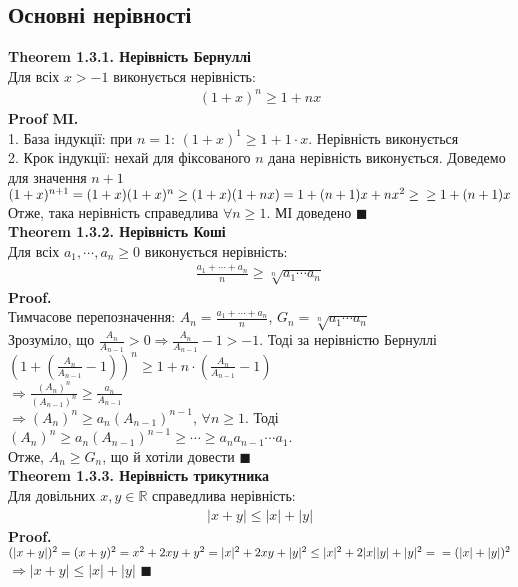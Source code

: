 \documentclass[a4paper, 14pt]{extarticle}
\def\huge{\displaystyle}
\def\bigline{\vspace{5mm}\\}
\def\bigline{\vspace{5mm}\\}
\def\qed{$\blacksquare$}
\begin{document}
\subsection{Основні нерівності}
	\textbf{Theorem 1.3.1. Нерівність Бернуллі}\\ Для всіх $x>-1$ виконується нерівність:
	\begin{align*}
	(1+x)^n \geq 1+nx
	\end{align*}
	\textbf{Proof MI.}\\
	1. База індукції: при $n=1$: $(1+x)^1 \geq 1+1\cdot x$. Нерівність виконується\\
	2. Крок індукції: нехай для фіксованого $n$ дана нерівність виконується. Доведемо для значення $n+1$\\
	$(1+x)^{n+1}=(1+x)(1+x)^n \geq (1+x)(1+nx)=1+(n+1)x+nx^2 \geq \\ \geq 1+(n+1)x$\\
	Отже, така нерівність справедлива $\forall n \geq 1$. МІ доведено \qed
	\bigline
	\textbf{Theorem 1.3.2. Нерівність Коші}\\
	Для всіх $a_1, \cdots, a_n \geq 0$ виконується нерівність:
	\begin{align*}
	\frac{a_1+\cdots+a_n}{n} \geq \sqrt[n]{a_1 \cdots a_n}
	\end{align*}
	\textbf{Proof.}\\
	Тимчасове перепозначення: $\huge A_n = \frac{a_1+\cdots+a_n}{n}$, $\huge G_n = \sqrt[n]{a_1 \cdots a_n}$\\
	Зрозуміло, що $\huge \frac{A_n}{A_{n-1}} > 0 \Rightarrow \frac{A_n}{A_{n-1}}-1>-1$. Тоді за нерівністю Бернуллі\\
	$\huge \left(1+ \left(\frac{A_n}{A_{n-1}} -1 \right) \right)^n \geq 1 + n \cdot \left(\frac{A_n}{A_{n-1}} -1 \right)$\\
	$\Rightarrow \huge \frac{(A_n)^n}{(A_{n-1})^n} \geq \frac{a_n}{A_{n-1}}$\\
	$\Rightarrow \huge (A_n)^n \geq a_n (A_{n-1})^{n-1}$, $\forall n \geq 1$. Тоді\\
	$(A_n)^n \geq a_n (A_{n-1})^{n-1} \geq \cdots \geq a_n a_{n-1} \cdots a_1$. \\ Отже,
	$A_n \geq G_n$, що й хотіли довести \qed
	\bigline
	\textbf{Theorem 1.3.3. Нерівність трикутника}\\
	Для довільних $x,y \in \mathbb{R}$ справедлива нерівність:
	\begin{align*}
	|x+y|\leq|x|+|y|
	\end{align*}
	\textbf{Proof.}\\
	$(|x+y|)^2=(x+y)^2=x^2+2xy+y^2 = |x|^2 + 2xy + |y|^2 \leq |x|^2 + 2|x||y|+|y|^2 = \\ = (|x|+|y|)^2$\\
	$\Rightarrow |x+y| \leq |x|+|y|$ \qed
	\\
	
\end{document}
